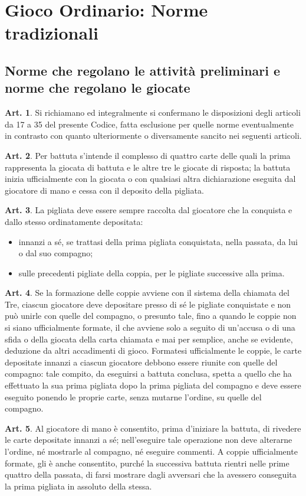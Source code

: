 \documentclass[italian,a4paper]{article}
\theoremstyle{definition}
\newtheorem{art}{Art.}
\begin{document}
\section{Gioco Ordinario: Norme tradizionali}
\subsection{Norme che regolano le attività preliminari e norme che regolano le giocate}
\begin{art}
Si richiamano ed integralmente si confermano le disposizioni degli articoli da 17 a 35 del presente Codice, fatta esclusione per quelle norme eventualmente in contrasto con quanto ulteriormente o diversamente sancito nei seguenti articoli.
\end{art}
\begin{art}
Per battuta s'intende il complesso di quattro carte delle quali la prima rappresenta la giocata di battuta e le altre tre le giocate di risposta; la battuta inizia ufficialmente con la giocata o con qualsiasi altra dichiarazione eseguita dal giocatore di mano e cessa con il deposito della pigliata.
\end{art}
\begin{art}
La pigliata deve essere sempre raccolta dal giocatore che la conquista e dallo stesso ordinatamente depositata:
\begin{itemize}
\item innanzi a sé, se trattasi della prima pigliata conquistata, nella passata, da lui o dal suo compagno;
\item sulle precedenti pigliate della coppia, per le pigliate successive alla prima.
    \end{itemize}
\end{art}
\begin{art}
Se la formazione delle coppie avviene con il sistema della chiamata del Tre, ciascun giocatore deve depositare presso di sé le pigliate conquistate e non può unirle con quelle del compagno, o presunto tale, fino a quando le coppie non si siano ufficialmente formate, il che avviene solo a seguito di un'accusa o di una sfida o della giocata della carta chiamata e mai per semplice, anche se evidente, deduzione da altri accadimenti di gioco. Formatesi ufficialmente le coppie, le carte depositate innanzi a ciascun giocatore debbono essere riunite con quelle del compagno: tale compito, da eseguirsi a battuta conclusa,   spetta a quello che ha effettuato la sua prima pigliata dopo la prima pigliata del compagno e deve essere eseguito ponendo le proprie carte, senza mutarne l'ordine, su quelle del compagno.
\end{art}
\begin{art}
Al giocatore di mano è consentito, prima d'iniziare la battuta, di rivedere le carte depositate innanzi a sé; nell'eseguire tale operazione non deve alterarne l'ordine, né mostrarle al compagno, né eseguire commenti. A coppie ufficialmente formate, gli è anche consentito, purché la successiva battuta rientri nelle prime quattro della passata, di farsi mostrare dagli avversari che la avessero conseguita la prima pigliata in assoluto della stessa.
\end{art}
\end{document}
